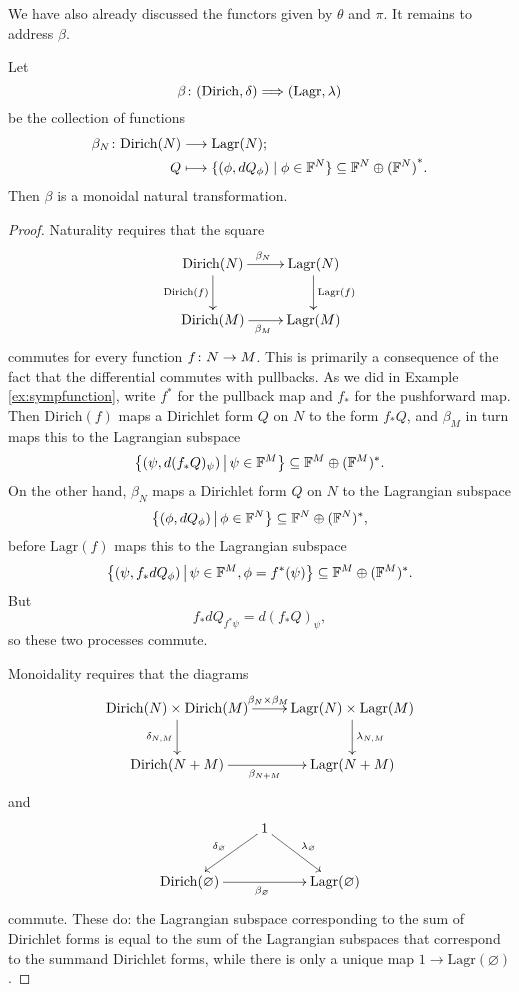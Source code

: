 We have also already discussed the functors given by $\theta$ and $\pi$.
It remains to address $\beta$.

\begin{proposition}
Let
\[
  \beta{\colon} (\mathrm{Dirich},\delta) \Longrightarrow (\mathrm{Lagr},\lambda)
\]
be the collection of functions
\begin{align*}
  \beta_N{\colon} \mathrm{Dirich}(N) &\longrightarrow \mathrm{Lagr}(N); \\
  Q &\longmapsto \{(\phi,dQ_\phi) \mid \phi \in {\mathbb F}^N\} \subseteq {{\mathbb F}^{N} \oplus {({\mathbb F}^{N})}^\ast}.
\end{align*}
Then $\beta$ is a monoidal natural transformation.
\end{proposition}

\begin{proof}
Naturality requires that the square
\[
\xymatrix{
  \mathrm{Dirich}(N) \ar[r]^{\beta_N} \ar[d]_{\mathrm{Dirich}(f)} &
  \mathrm{Lagr}(N) \ar[d]^{\mathrm{Lagr}(f)}  \\
  \mathrm{Dirich}(M) \ar[r]_{\beta_M} & \mathrm{Lagr}(M)
}
\]
commutes for every function $f{\colon} N \to M$. This is primarily a consequence of the
fact that the differential commutes with pullbacks. As we did in Example
\ref{ex:sympfunction},
write $f^\ast$ for the pullback map and $f_\ast$ for the pushforward map.
Then $\mathrm{Dirich}(f)$ maps a Dirichlet form $Q$ on $N$ to the form $f_\ast Q$,
and $\beta_M$ in turn maps this to the Lagrangian subspace 
\[
  \big\{(\psi,d(f_\ast Q)_\psi) \, \big\vert \, \psi \in {\mathbb F}^M\big\} \subseteq
  {\mathbb F}^M \oplus ({\mathbb F}^M)^\ast.
\]
On the other hand, $\beta_N$ maps a Dirichlet form $Q$ on $N$ to the Lagrangian
subspace
\[
\big\{(\phi,dQ_\phi) \,\big\vert\, \phi \in {\mathbb F}^N\big\}\subseteq
  {\mathbb F}^N \oplus ({\mathbb F}^N)^\ast, 
\]
before $\mathrm{Lagr}(f)$ maps this to the Lagrangian subspace
\[
  \big\{(\psi, f_\ast dQ_\phi) \,\big\vert\, \psi \in {\mathbb F}^M, \phi =
  f^\ast(\psi)\big\} \subseteq {\mathbb F}^M\oplus ({\mathbb F}^M)^\ast.
\]
But 
\[
  f_\ast dQ_{f^\ast\psi} = d(f_\ast Q)_{\psi},
\]
so these two processes commute.

Monoidality requires that the diagrams 
\[
\xymatrix{
  \mathrm{Dirich}(N) \times \mathrm{Dirich}(M) \ar[r]^(.52){\beta_N \times
  \beta_M} \ar[d]_{\delta_{N,M}} & \mathrm{Lagr}(N) \times \mathrm{Lagr}(M)
  \ar[d]^{\lambda_{N,M}}  \\
  \mathrm{Dirich}(N+M) \ar[r]_{\beta_{N+M}} & \mathrm{Lagr}(N+M)
}
\]
and
\[
  \xymatrix{
  & 1 \ar[dl]_{\delta_\varnothing} \ar[dr]^{\lambda_\varnothing}\\
\mathrm{Dirich}(\varnothing)  \ar[rr]_{\beta_\varnothing} &&
\mathrm{Lagr}(\varnothing)
}
\]
commute. These do: the Lagrangian subspace corresponding to the sum of Dirichlet
forms is equal to the sum of the Lagrangian subspaces that correspond to the
summand Dirichlet forms, while there is only a unique map $1 \to
\mathrm{Lagr}(\varnothing)$.
\end{proof}


